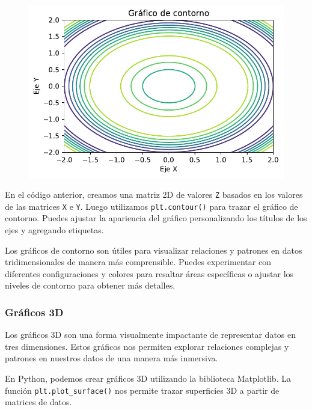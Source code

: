 \documentclass[
  a4paper,
]{article}
\begin{document}
\begin{figure}[H]

{\centering \includegraphics{index_files/figure-pdf/cell-5-output-1.pdf}

}

\end{figure}

En el código anterior, creamos una matriz 2D de valores \texttt{Z}
basados en los valores de las matrices \texttt{X} e \texttt{Y}. Luego
utilizamos \texttt{plt.contour()} para trazar el gráfico de contorno.
Puedes ajustar la apariencia del gráfico personalizando los títulos de
los ejes y agregando etiquetas.

Los gráficos de contorno son útiles para visualizar relaciones y
patrones en datos tridimensionales de manera más comprensible. Puedes
experimentar con diferentes configuraciones y colores para resaltar
áreas específicas o ajustar los niveles de contorno para obtener más
detalles.

\hypertarget{gruxe1ficos-3d-1}{%
\subsubsection{Gráficos 3D}\label{gruxe1ficos-3d-1}}

Los gráficos 3D son una forma visualmente impactante de representar
datos en tres dimensiones. Estos gráficos nos permiten explorar
relaciones complejas y patrones en nuestros datos de una manera más
inmersiva.

En Python, podemos crear gráficos 3D utilizando la biblioteca
Matplotlib. La función \texttt{plt.plot\_surface()} nos permite trazar
superficies 3D a partir de matrices de datos.
\end{document}
